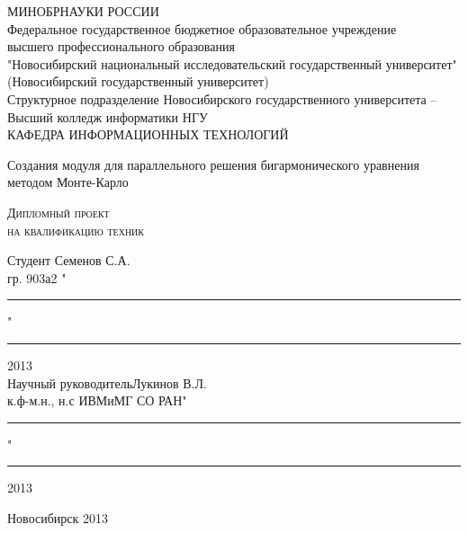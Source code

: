 \begin{titlepage}

\begin{center}
МИНОБРНАУКИ РОССИИ\\
Федеральное государственное бюджетное образовательное учреждение\\
высшего профессионального образования \\
\hspace{-10mm}"Новосибирский национальный исследовательский государственный университет"\\
(Новосибирский государственный университет)\\
\hspace{-7mm}Структурное подразделение Новосибирского государственного университета -- \\
Высший колледж информатики НГУ\\
КАФЕДРА ИНФОРМАЦИОННЫХ ТЕХНОЛОГИЙ
\end{center}


\vspace{8em}

\begin{center}
\Large Создания модуля для параллельного решения бигармонического уравнения методом Монте-Карло 
\end{center}

\vspace{2.5em}

\begin{center}
\textsc{Дипломный проект\\ на квалификацию техник }
\end{center}

\vspace{6em}

\begin{flushleft}
 Студент \hfill Семенов С.А. \\
гр. 903а2 \hfill "\rule{3ex}{0,1mm}"\rule{10ex}{0,1mm}2013 \\
\vspace{1.5em}
Научный руководитель\hfill Лукинов В.Л.\\
к.ф-м.н., н.с ИВМиМГ СО РАН\hfill "\rule{3ex}{0,1mm}"\rule{10ex}{0,1mm}2013 \\
\end{flushleft}

\vspace{\fill}
\begin{center}
Новосибирск 2013
\end{center}
\end{titlepage}
